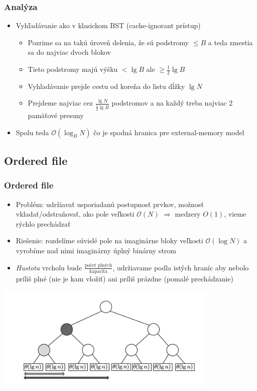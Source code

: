 \documentclass{beamer}
\newcommand{\bigO}{\ensuremath{\mathcal{O}}}
\begin{document}
\begin{frame}
    \frametitle{Analýza}
    \begin{itemize}
        \item Vyhľadávanie ako v klasickom BST (cache-ignorant prístup)
        \begin{itemize}
            \item Pozrime sa na takú úroveň delenia, že sú podstromy $\le B$ a teda zmestia sa do najviac dvoch blokov
            \item Tieto podstromy majú výšku $< \lg{B}$ ale $\ge \frac{1}{2}\lg{B}$
            \item Vyhladávanie prejde cestu od koreňa do listu dĺžky $\lg N$
            \item Prejdeme najviac cez $\frac{\lg N}{\frac{1}{2}\lg{B}}$ podstromov a na každý treba najviac 2 pamäťové presuny
        \end{itemize}
        \item Spolu teda $\bigO(\log_{B}{N})$ čo je spodná hranica pre external-memory model
    \end{itemize}
\end{frame}

\subsection{Ordered file}
\begin{frame}
    \frametitle{Ordered file}
    \begin{itemize}
        \item Problém: udržiavať usporiadanú postupnosť prvkov, možnosť vkladať/odstraňovať, ako pole veľkosti $\bigO(N)$ $\Rightarrow$ medzery $O(1)$, vieme rýchlo prechádzať
        \item Riešenie: rozdelíme súvislé pole na imaginárne bloky veľkosti $\bigO(\log N)$ a vyrobíme nad nimi imaginárny úplný binárny strom
        \item {\em Hustota} vrcholu bude $\frac{\text{počet plných}}{\text{kapacita}}$, udržiavame podla istých hraníc aby nebolo príliš plné (nie je kam vložiť) ani príliš prázdne (pomalé prechádzanie)
    \end{itemize}
\end{frame}

\begin{frame}
\begin{center}
        \includegraphics[width=0.8\textwidth,]{../figures/downloaded_dont_use/fig2-ofm.jpg}
    \end{center}
\end{frame}
\end{document}
